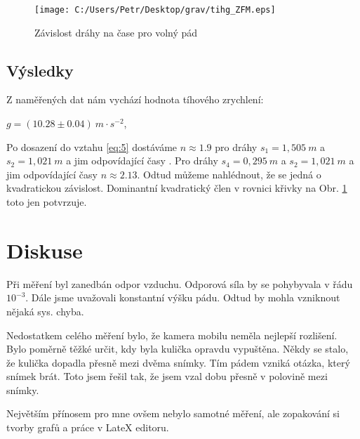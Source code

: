 \begin{figure}[h]
	\centering
\vspace{0.2cm}
	\texttt{[image: C:/Users/Petr/Desktop/grav/tihg\_ZFM.eps]}
	\caption{Závislost dráhy na čase pro volný pád}
	\label{fig:pic}
\end{figure}
\newpage
\subsection{Výsledky}\label{pokus}
Z naměřených dat nám vychází hodnota tíhového zrychlení:
\begin{center}
	\begin{Large}
		$g = (10.28\pm 0.04) ~m \cdot s^{-2}$,
	\end{Large}
\end{center}

Po dosazení do vztahu \eqref{eq:5} dostáváme $n \approx 1.9$ pro dráhy $s_{1} = 1,505~m $ a $s_{2} = 1,021~m $ a jim odpovídající časy . Pro dráhy  $s_{4} = 0,295~m $ a $s_{2} = 1,021~m $ a jim odpovídající časy $n \approx 2.13$. Odtud můžeme nahlédnout, že se jedná o kvadratickou závislost. Dominantní kvadratický člen v rovnici křivky na Obr. \ref{fig:pic} toto jen potvrzuje.


\section{Diskuse}
Při měření byl zanedbán odpor vzduchu. Odporová síla by se pohybyvala v řádu $10^{-3}$. Dále jsme uvažovali konstantní výšku pádu. Odtud by mohla vzniknout nějaká sys. chyba.

Nedostatkem celého měření bylo, že kamera mobilu neměla nejlepší rozlišení. Bylo poměrně těžké určit, kdy byla kulička opravdu vypuštěna. Někdy se stalo, že kulička dopadla přesně mezi dvěma snímky. Tím pádem vzniká otázka, který snímek brát. Toto jsem řešil tak, že jsem vzal dobu přesně v polovině mezi snímky.

Největším přínosem pro mne ovšem nebylo samotné měření, ale zopakování si tvorby grafů a práce v LateX editoru. 






